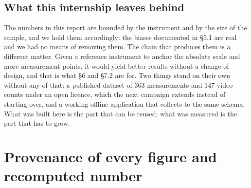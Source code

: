 \documentclass[11pt,a4paper]{article}
\begin{document}
\subsection{What this internship leaves behind}

The numbers in this report are bounded by the instrument and by the size of the
sample, and we hold them accordingly: the biases documented in §5.1 are real and
we had no means of removing them. The chain that produces them is a different
matter. Given a reference instrument to anchor the absolute scale and more
measurement points, it would yield better results without a change of design, and
that is what §6 and §7.2 are for. Two things stand on their own without any of that: a published dataset of 363
measurements and 147 video counts under an open licence, which the next
campaign extends instead of starting over, and a working offline application
that collects to the same schema. What was built here is the part that can be
reused; what was measured is the part that has to grow.

\appendix
\clearpage
\section{Provenance of every figure and recomputed number}
\end{document}
